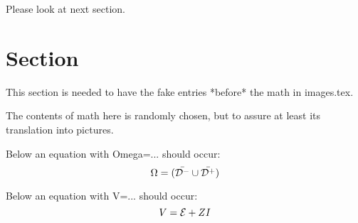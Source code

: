 \theoremstyle{plain}
\newtheorem{Defi}[equation]{Definition}
\newtheorem{Theo}[equation]{Theorem}

\theoremstyle{break}
\newtheorem{Pb}[equation]{Problem}
\theoremheaderfont{\scshape}




Please look at next section.

\section{Section}
This section is needed to have the fake entries *before*
the math in images.tex.

The contents of math here is randomly chosen, but to assure at
least its translation into pictures.

Below an equation with Omega=... should occur:
$$\Omega=(\bar{{\cal D}^-}\cup\bar{{\cal D}^+})$$

Below an equation with V=... should occur:
$$ V={\cal E}+ZI $$


